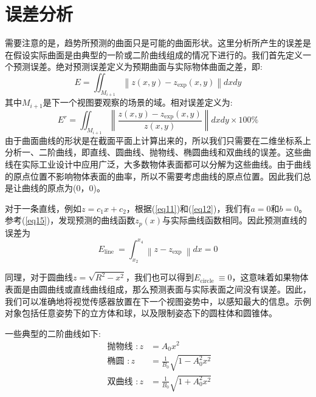 \documentclass[AutoFakeBold,zihao=-4]{ctexart}
\begin{document}
	\section{误差分析}
	需要注意的是，趋势所预测的曲面只是可能的曲面形状。这里分析所产生的误差是在假设实际曲面是由典型的一阶或二阶曲线组成的情况下进行的。我们首先定义一个预测误差。绝对预测误差定义为预期曲面与实际物体曲面之差，即:
	\begin{equation}
		E=\iint_{M_{i+1}}\left\|z(x, y)-z_{\exp }(x, y)\right\| d x d y
		\label{eq24}
	\end{equation}
	其中$ M_{i+1} $是下一个视图要观察的场景的域。相对误差定义为:
	\begin{equation}
		E^{r}=\iint_{M_{i+1}}\left\|\frac{z(x, y)-z_{\exp }(x, y)}{z(x, y)}\right\| d x d y \times 100 \%
		\label{eq25}
	\end{equation}
	由于曲面曲线的形状是在截面平面上计算出来的，所以我们只需要在二维坐标系上分析一、二阶曲线，即直线、圆曲线、抛物线、椭圆曲线和双曲线的误差。这些曲线在实际工业设计中应用广泛，大多数物体表面都可以分解为这些曲线。由于曲线的原点位置不影响物体表面的曲率，所以不需要考虑曲线的原点位置。因此我们总是让曲线的原点为(0，0)。

	对于一条直线，例如$ z=c_{1} x+c_{2} $，根据(\ref{eq11})和(\ref{eq12})，我们有$ a=0 $和$ b =0 $。参考(\ref{eq15})，发现预测的曲线函数$ z_{p}(x) $与实际曲线函数相同。因此预测直线的误差为
	\begin{equation*}
		E_{\text {line }}=\int_{x_{2}}^{x_{4}}\left\|z-z_{\text {exp }}\right\| d x=0
	\end{equation*}

	同理，对于圆曲线$ z=\sqrt{R^{2}-x^{2}} $，我们也可以得到$ E_{\text {circle }} \equiv 0 $，这意味着如果物体表面是由圆曲线或直线曲线组成，那么预测表面与实际表面之间没有误差。因此，我们可以准确地将视觉传感器放置在下一个视图姿势中，以感知最大的信息。示例对象包括任意姿势下的立方体和球，以及限制姿态下的圆柱体和圆锥体。
	
	一些典型的二阶曲线如下:
	\begin{equation*}
		\begin{aligned}
			\text { 抛物线 }: z &=A_{0} x^{2} \\
			\text { 椭圆 }: z &=\frac{1}{B_{0}} \sqrt{1-A_{0}^{2} x^{2}} \\
			\text { 双曲线 }: z &=\frac{1}{B_{0}} \sqrt{1+A_{0}^{2} x^{2}}
		\end{aligned}
	\end{equation*}
\end{document}
